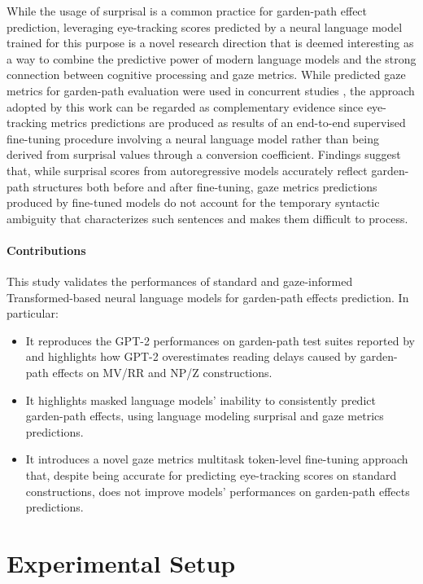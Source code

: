 \documentclass[a4paper, nobind]{templates/ociamthesis}
\begin{document}
While the usage of surprisal is a common practice for garden-path effect prediction, leveraging eye-tracking scores predicted by a neural language model trained for this purpose is a novel research direction that is deemed interesting as a way to combine the predictive power of modern language models and the strong connection between cognitive processing and gaze metrics. While predicted gaze metrics for garden-path evaluation were used in concurrent studies \autocite{schjindel-linzen-2020-single}, the approach adopted by this work can be regarded as complementary evidence since eye-tracking metrics predictions are produced as results of an end-to-end supervised fine-tuning procedure involving a neural language model rather than being derived from surprisal values through a conversion coefficient. Findings suggest that, while surprisal scores from autoregressive models accurately reflect garden-path structures both before and after fine-tuning, gaze metrics predictions produced by fine-tuned models do not account for the temporary syntactic ambiguity that characterizes such sentences and makes them difficult to process.

\paragraph{Contributions} This study validates the performances of standard and gaze-informed Transformed-based neural language models for garden-path effects prediction. In particular:

\begin{itemize}
\item
  It reproduces the GPT-2 performances on garden-path test suites reported by \textcite{gauthier-etal-2020-syntaxgym} and highlights how GPT-2 overestimates reading delays caused by garden-path effects on MV/RR and NP/Z constructions.
\item
  It highlights masked language models' inability to consistently predict garden-path effects, using language modeling surprisal and gaze metrics predictions.
\item
  It introduces a novel gaze metrics multitask token-level fine-tuning approach that, despite being accurate for predicting eye-tracking scores on standard constructions, does not improve models' performances on garden-path effects predictions.
\end{itemize}

\hypertarget{subchap:ex3-setup}{%
\section{Experimental Setup}\label{subchap:ex3-setup}}
\end{document}
